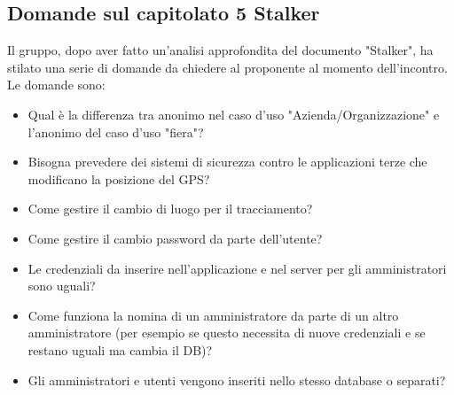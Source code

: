 \subsection{Domande sul capitolato 5 Stalker}
Il gruppo, dopo aver fatto un'analisi approfondita del documento "Stalker", ha stilato una serie di domande da chiedere al proponente al momento dell'incontro.
Le domande sono:
\begin{itemize}
	\item Qual è la differenza tra anonimo nel caso d’uso "Azienda/Organizzazione" e l’anonimo del caso d’uso "fiera"?
	\item Bisogna prevedere dei sistemi di sicurezza contro le applicazioni terze che modificano la posizione del GPS?
	\item Come gestire il cambio di luogo per il tracciamento?
	\item Come gestire il cambio password da parte dell’utente?
	\item Le credenziali da inserire nell’applicazione e nel server per gli amministratori sono uguali?
	\item Come funziona la nomina di un amministratore da parte di un altro amministratore (per esempio se questo necessita di nuove credenziali e se restano uguali ma cambia il DB)?
	\item Gli amministratori e utenti vengono inseriti nello stesso database o separati?
\end{itemize}



\clearpage
